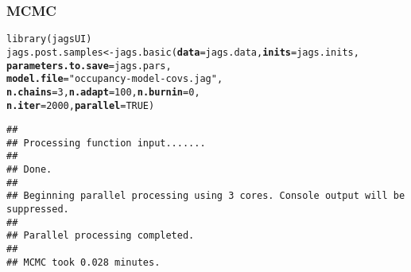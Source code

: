 \documentclass[color=usenames,dvipsnames]{beamer}\usepackage[]{graphicx}\usepackage[]{xcolor}
\makeatletter
\newcommand{\hlnum}[1]{\textcolor[rgb]{0.69,0.494,0}{#1}}%
\newcommand{\hlstr}[1]{\textcolor[rgb]{0.749,0.012,0.012}{#1}}%
\newcommand{\hlstd}[1]{\textcolor[rgb]{0,0,0}{#1}}%
\newcommand{\hlkwb}[1]{\textcolor[rgb]{0,0.341,0.682}{#1}}%
\newcommand{\hlkwc}[1]{\textcolor[rgb]{0,0,0}{\textbf{#1}}}%
\newcommand{\hlkwd}[1]{\textcolor[rgb]{0.004,0.004,0.506}{#1}}%
\newenvironment{kframe}{%
 \def\at@end@of@kframe{}%
 \ifinner\ifhmode%
  \def\at@end@of@kframe{\end{minipage}}%
  \begin{minipage}{\columnwidth}%
 \fi\fi%
 \def\FrameCommand##1{\hskip\@totalleftmargin \hskip-\fboxsep
 \colorbox{shadecolor}{##1}\hskip-\fboxsep
     \hskip-\linewidth \hskip-\@totalleftmargin \hskip\columnwidth}%
 \MakeFramed {\advance\hsize-\width
   \@totalleftmargin\z@ \linewidth\hsize
   \@setminipage}}%
 {\par\unskip\endMakeFramed%
 \at@end@of@kframe}
\newenvironment{knitrout}{}{} %
\makeatother
\begin{document}
\begin{frame}[fragile]
  \frametitle{MCMC}
  \small
\begin{knitrout}\scriptsize
{}\color{fgcolor}\begin{kframe}
\begin{alltt}
\hlkwd{library}\hlstd{(jagsUI)}
\hlstd{jags.post.samples} \hlkwb{<-} \hlkwd{jags.basic}\hlstd{(}\hlkwc{data}\hlstd{=jags.data,} \hlkwc{inits}\hlstd{=jags.inits,}
                                \hlkwc{parameters.to.save}\hlstd{=jags.pars,}
                                \hlkwc{model.file}\hlstd{=}\hlstr{"occupancy-model-covs.jag"}\hlstd{,}
                                \hlkwc{n.chains}\hlstd{=}\hlnum{3}\hlstd{,} \hlkwc{n.adapt}\hlstd{=}\hlnum{100}\hlstd{,} \hlkwc{n.burnin}\hlstd{=}\hlnum{0}\hlstd{,}
                                \hlkwc{n.iter}\hlstd{=}\hlnum{2000}\hlstd{,} \hlkwc{parallel}\hlstd{=}\hlnum{TRUE}\hlstd{)}
\end{alltt}
\begin{verbatim}
## 
## Processing function input....... 
## 
## Done. 
##  
## Beginning parallel processing using 3 cores. Console output will be suppressed.
## 
## Parallel processing completed.
## 
## MCMC took 0.028 minutes.
\end{verbatim}
\end{kframe}
\end{knitrout}
\end{frame}
\end{document}
